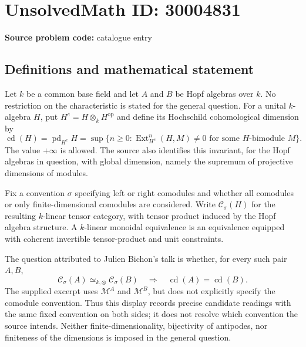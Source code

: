 \documentclass[11pt]{article}
\begin{document}
\section*{UnsolvedMath ID: 30004831}
\textbf{Source problem code:} catalogue entry
\subsection{Definitions and mathematical statement}
Let \(k\) be a common base field and let \(A\) and \(B\) be Hopf algebras over \(k\). No restriction on the characteristic is stated for the general question. For a unital \(k\)-algebra \(H\), put \(H^e=H\otimes_k H^{\mathrm{op}}\) and define its Hochschild cohomological dimension by
\[
\operatorname{cd}(H)=\operatorname{pd}_{H^e}H
=\sup\{n\geq 0:\operatorname{Ext}_{H^e}^{n}(H,M)\neq 0\text{ for some }H\text{-bimodule }M\}.
\]
The value \(+\infty\) is allowed. The source also identifies this invariant, for the Hopf algebras in question, with global dimension, namely the supremum of projective dimensions of modules.

Fix a convention \(\sigma\) specifying left or right comodules and whether all comodules or only finite-dimensional comodules are considered. Write \(\mathcal C_\sigma(H)\) for the resulting \(k\)-linear tensor category, with tensor product induced by the Hopf algebra structure. A \(k\)-linear monoidal equivalence is an equivalence equipped with coherent invertible tensor-product and unit constraints.

The question attributed to Julien Bichon's talk is whether, for every such pair \(A,B\),
\[
\mathcal C_\sigma(A)\simeq_{k,\otimes}\mathcal C_\sigma(B)
\quad\Longrightarrow\quad
\operatorname{cd}(A)=\operatorname{cd}(B).
\]
The supplied excerpt uses \(\mathcal M^A\) and \(\mathcal M^B\), but does not explicitly specify the comodule convention. Thus this display records precise candidate readings with the same fixed convention on both sides; it does not resolve which convention the source intends. Neither finite-dimensionality, bijectivity of antipodes, nor finiteness of the dimensions is imposed in the general question.
\end{document}
